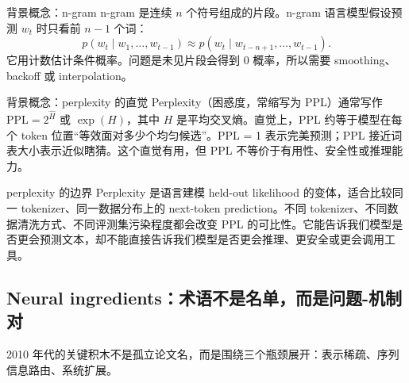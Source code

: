 \begin{importantbox}{背景概念：n-gram}
n-gram 是连续 \(n\) 个符号组成的片段。n-gram 语言模型假设预测 \(w_t\) 时只看前 \(n-1\) 个词：
\[
p(w_t\mid w_1,\ldots,w_{t-1})\approx p(w_t\mid w_{t-n+1},\ldots,w_{t-1}).
\]
它用计数估计条件概率。问题是未见片段会得到 0 概率，所以需要 smoothing、backoff 或 interpolation。
\end{importantbox}

\begin{knowledgebox}{背景概念：perplexity 的直觉}
Perplexity（困惑度，常缩写为 PPL）通常写作 \(\mathrm{PPL}=2^{\widehat H}\) 或 \(\exp(H)\)，其中 \(H\) 是平均交叉熵。直觉上，PPL 约等于模型在每个 token 位置“等效面对多少个均匀候选”。PPL = 1 表示完美预测；PPL 接近词表大小表示近似瞎猜。这个直觉有用，但 PPL 不等价于有用性、安全性或推理能力。
\end{knowledgebox}

\begin{warningbox}{perplexity 的边界}
Perplexity 是语言建模 held-out likelihood 的变体，适合比较同一 tokenizer、同一数据分布上的 next-token prediction。不同 tokenizer、不同数据清洗方式、不同评测集污染程度都会改变 PPL 的可比性。它能告诉我们模型是否更会预测文本，却不能直接告诉我们模型是否更会推理、更安全或更会调用工具。
\end{warningbox}

\subsection{Neural ingredients：术语不是名单，而是问题-机制对}

2010 年代的关键积木不是孤立论文名，而是围绕三个瓶颈展开：表示稀疏、序列信息路由、系统扩展。

